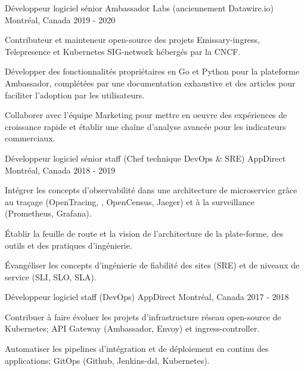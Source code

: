 \begin{cventries}
  \cventry
    {Développeur logiciel sénior} %
    {Ambassador Labs (anciennement Datawire.io)} %
    {Montréal, Canada} %
    {2019 - 2020} %
    {
      \begin{cvitems} %
        \item {Contributeur et mainteneur open-source des projets Emissary-ingress, Telepresence et Kubernetes SIG-network hébergés par la CNCF.}
        \item {Développer des fonctionnalités propriétaires en Go et Python pour la plateforme Ambassador, complétées par une documentation exhaustive et des articles pour faciliter l'adoption par les utilisateurs.}
        \item {Collaborer avec l'équipe Marketing pour mettre en oeuvre des expériences de croissance rapide et établir une chaîne d'analyse avancée pour les indicateurs commerciaux.}
      \end{cvitems}
    }

  \cventry
    {Développeur logiciel sénior staff (Chef technique DevOps \& SRE)} %
    {AppDirect} %
    {Montréal, Canada} %
    {2018 - 2019} %
    {
      \begin{cvitems} %
        \item {Intégrer les concepts d'observabilité dans une architecture de microservice grâce au traçage (OpenTracing, , OpenCensus, Jaeger) et à la surveillance (Prometheus, Grafana).}
        \item {Établir la feuille de route et la vision de l'architecture de la plate-forme, des outils et des pratiques d'ingénierie.}
        \item {Évangéliser les concepts d'ingénierie de fiabilité des sites (SRE) et de niveaux de service (SLI, SLO, SLA).}
      \end{cvitems}
    }

  \cventry
    {Développeur logiciel staff (DevOps)} %
    {AppDirect} %
    {Montréal, Canada} %
    {2017 - 2018} %
    {
      \begin{cvitems} %
        \item {Contribuer à faire évoluer les projets d'infrastructure réseau open-source de Kubernetes; API Gateway (Ambassador, Envoy) et ingress-controller.}
        \item {Automatiser les pipelines d'intégration et de déploiement en continu des applications; GitOps (Github, Jenkins-dsl, Kubernetes).}
      \end{cvitems}
    }


\end{cventries}
